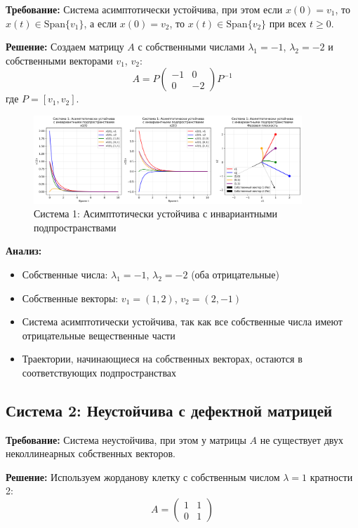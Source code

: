 \textbf{Требование:} Система асимптотически устойчива, при этом если $x(0) = v_1$, то $x(t) \in \text{Span}\{v_1\}$, а если $x(0) = v_2$, то $x(t) \in \text{Span}\{v_2\}$ при всех $t \geq 0$.

\textbf{Решение:} Создаем матрицу $A$ с собственными числами $\lambda_1 = -1$, $\lambda_2 = -2$ и собственными векторами $v_1$, $v_2$:
\begin{equation}
A = P \begin{pmatrix} -1 & 0 \\ 0 & -2 \end{pmatrix} P^{-1}
\end{equation}
где $P = [v_1, v_2]$.

\begin{figure}[H]
    \centering
    \includegraphics[width=0.9\textwidth]{images/task1/system1_asymptotically_stable.png}
    \caption{Система 1: Асимптотически устойчива с инвариантными подпространствами}
\end{figure}

\textbf{Анализ:}
\begin{itemize}
    \item Собственные числа: $\lambda_1 = -1$, $\lambda_2 = -2$ (оба отрицательные)
    \item Собственные векторы: $v_1 = (1, 2)$, $v_2 = (2, -1)$
    \item Система асимптотически устойчива, так как все собственные числа имеют отрицательные вещественные части
    \item Траектории, начинающиеся на собственных векторах, остаются в соответствующих подпространствах
\end{itemize}

\subsection*{Система 2: Неустойчива с дефектной матрицей}

\textbf{Требование:} Система неустойчива, при этом у матрицы $A$ не существует двух неколлинеарных собственных векторов.

\textbf{Решение:} Используем жорданову клетку с собственным числом $\lambda = 1$ кратности 2:
\begin{equation}
A = \begin{pmatrix} 1 & 1 \\ 0 & 1 \end{pmatrix}
\end{equation}

